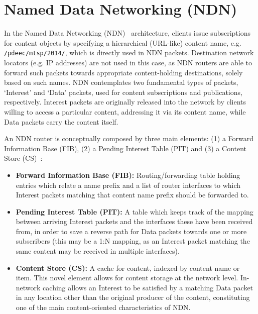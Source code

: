 \section{Named Data Networking (NDN)}
\label{sec:ndn}

In the Named Data Networking (NDN)~\cite{Jacobson2009} architecture, 
clients issue subscriptions for content 
objects by specifying 
a hierarchical (URL-like) content name, e.g. 
\verb+/pdeec+\addthinspace\verb+/mtsp/+\addthinspace\verb+2014/+, which is 
directly used in NDN packets. 
Destination network locators (e.g. IP addresses) are not used in this case, as 
NDN routers are able 
to forward such packets towards appropriate content-holding destinations, solely based 
on such names. NDN contemplates two fundamental types of packets, `Interest' and `Data' packets, 
used for content subscriptions and publications, respectively. Interest packets 
are originally released into the network by clients willing to access a 
particular content, addressing it via its content name, while Data packets 
carry the content itself.\shortvertbreak

An NDN router is conceptually composed by three main elements: (1) a 
Forward Information 
Base (FIB), (2) a Pending Interest Table (PIT) and (3) a Content Store 
(CS)~\cite{Jacobson2009}:

\begin{itemize}

    \item \textbf{Forward Information Base (FIB):} Routing\slash forwarding 
        table holding entries 
        which relate a name prefix and a list of router interfaces to which 
        Interest packets matching that content name prefix should be forwarded 
        to.
    \item \textbf{Pending Interest Table (PIT):} A table which keeps track of 
        the mapping between arriving Interest packets and 
        the interfaces these have been received from, in order to save a reverse 
        path for Data packets 
        towards one or more subscribers (this may be a 1:N mapping, as an 
        Interest packet matching the same content may be received in 
        multiple interfaces).
    \item \textbf{Content Store (CS):} A cache for content, indexed by content 
        name or item. This novel element allows for content storage at the 
        network level. In-network caching allows an Interest to be satisfied 
        by a matching Data packet in any location other than the original 
        producer of the content, constituting one of the main 
        content-oriented characteristics of NDN.

\end{itemize}

